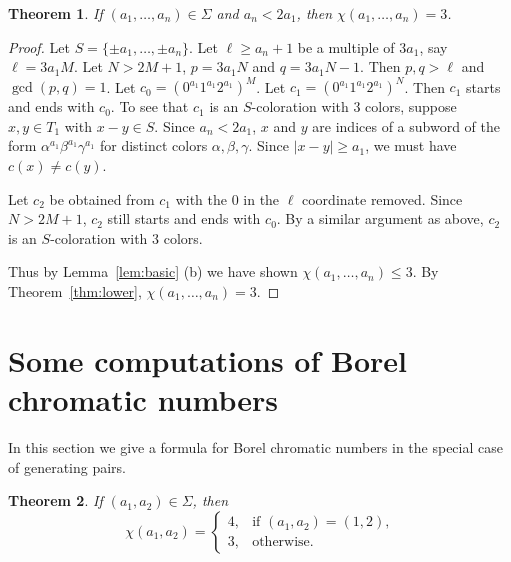 \documentclass[11pt]{amsart}
\newtheorem{theorem}{Theorem}[section]
\theoremstyle{definition}
\begin{document}
\begin{theorem}\label{thm:2a1} If $(a_1, \dots, a_n)\in \Sigma$ and $a_n<2a_1$, then $\chi(a_1,\dots, a_n)=3$.
\end{theorem}
\begin{proof} Let $S=\{\pm a_1, \dots, \pm a_n\}$. Let $\ell\geq a_n+1$ be a multiple of $3a_1$, say $\ell=3a_1M$. Let $N>2M+1$, $p=3a_1N$ and $q=3a_1N-1$. Then $p, q>\ell$ and $\gcd(p, q)=1$. Let $c_0=(0^{a_1}1^{a_1}2^{a_1})^M$. Let $c_1=(0^{a_1}1^{a_1}2^{a_1})^N$. Then $c_1$ starts and ends with $c_0$. To see that $c_1$ is an $S$-coloration with $3$ colors, suppose $x, y\in T_1$ with $x-y\in S$. Since $a_n<2a_1$, $x$ and $y$ are indices of a subword of the form $\alpha^{a_1}\beta^{a_1}\gamma^{a_1}$ for distinct colors $\alpha, \beta, \gamma$. Since $|x-y|\geq a_1$, we must have $c(x)\neq c(y)$. 

Let $c_2$ be obtained from $c_1$ with the $0$ in the $\ell$ coordinate removed. Since $N>2M+1$, $c_2$ still starts and ends with $c_0$. By a similar argument as above, $c_2$ is an $S$-coloration with $3$ colors.

Thus by Lemma~\ref{lem:basic} (b) we have shown $\chi(a_1, \dots, a_n)\leq 3$. By Theorem~\ref{thm:lower}, $\chi(a_1,\dots, a_n)=3$.
\end{proof}





































\section{Some computations of Borel chromatic numbers}\label{sec:6}
In this section we give a formula for Borel chromatic numbers in the special case of generating pairs.

\begin{theorem}\label{thm:pair} If $(a_1, a_2)\in \Sigma$, then
$$ \chi(a_1, a_2)=\left\{\begin{array}{ll}4, & \mbox{if $(a_1, a_2)=(1,2)$,} \\3, & \mbox{otherwise.}\end{array}\right. $$
\end{theorem}
\end{document}

